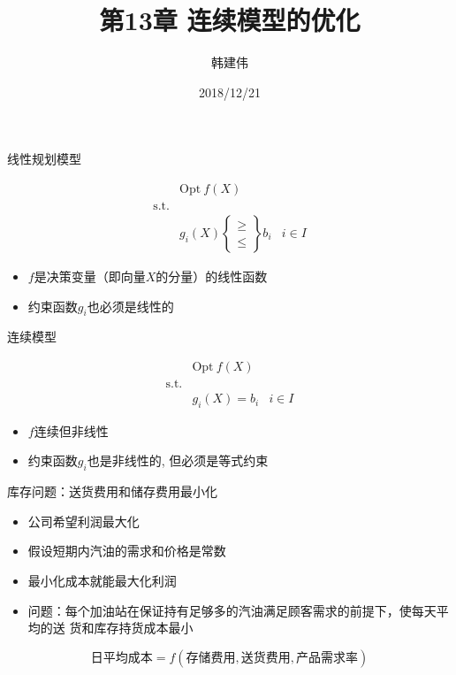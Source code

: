 \documentclass[UTF8]{ctexbeamer}
\title{第13章 连续模型的优化}
\author{韩建伟}
\institute{
  信息学院\\
  \texttt{hanjianwei@zjgsu.edu.cn}
}
\date{2018/12/21}
\begin{document}
\begin{frame}[plain]
  \titlepage{}
\end{frame}

\begin{frame}{线性规划模型}
  \begin{block}{}
    \[ 
    \begin{array}{lcl}
      & \mbox{Opt}\ f(X) & \\
      \mbox{s.t.} & &  \\
      &
      g_i(X) \left\{
        \begin{array}{c}
          \ge\\
          \le
        \end{array}
      \right\} b_i& i \in I
    \end{array}
    \]
  \end{block}

  \begin{itemize}
  \item $f$是决策变量（即向量$X$的分量）的线性函数
  \item 约束函数$g_i$也必须是线性的
  \end{itemize}
  
\end{frame}

\begin{frame}{连续模型}
  \begin{block}{}
    \[ 
    \begin{array}{lcl}
      & \mbox{Opt}\ f(X) & \\
      \mbox{s.t.} & &  \\
      &
      g_i(X) = b_i& i \in I
    \end{array}
    \]
  \end{block}

  \begin{itemize}
  \item $f$连续但非线性
  \item 约束函数$g_i$也是非线性的, 但必须是等式约束
  \end{itemize}
  
\end{frame}

\begin{frame}{库存问题：送货费用和储存费用最小化}

  \begin{itemize}
  \item<1-> 公司希望利润最大化
  \item<2-> 假设短期内汽油的需求和价格是常数
  \item<3-> 最小化成本就能最大化利润
  \item<4-> 问题：每个加油站在保证持有足够多的汽油满足顾客需求的前提下，使每天平均的送
    货和库存持货成本最小 
  \end{itemize}

   {
    \[
      \text{日平均成本} = f(\text{存储费用}, \text{送货费用}, \text{产品需求率})
    \]
  }
  
\end{frame}
\end{document}
